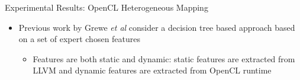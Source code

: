 \documentclass[10pt]{beamer}
\begin{document}
\begin{frame}{Experimental Results: OpenCL Heterogeneous Mapping}
\begin{itemize}
\item<1->{Previous work by Grewe \textit{et al} consider a decision tree based approach based on a set of expert chosen features
         \begin{itemize}
         \item<2->{Features are both static and dynamic: static features are extracted from LLVM and dynamic features are extracted from OpenCL runtime}
         \end{itemize}}
\end{itemize}
\end{frame}
\end{document}
